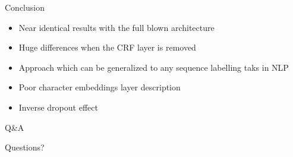 \documentclass{beamer}
\begin{document}
\begin{frame}{Conclusion}
    \begin{itemize}
        \item{
                Near identical results with the full blown architecture
            }
        \item{
                Huge differences when the CRF layer is removed
            }
        \item{
                Approach which can be generalized to any sequence labelling
                taks in NLP
            }
        \item{
                Poor character embeddings layer description
            }
        \item{
                Inverse dropout effect
            }
    \end{itemize}
\end{frame}

\begin{frame}{Q\&A}
    \begin{center}
    \Huge Questions?
    \end{center}
\end{frame}
\end{document}
